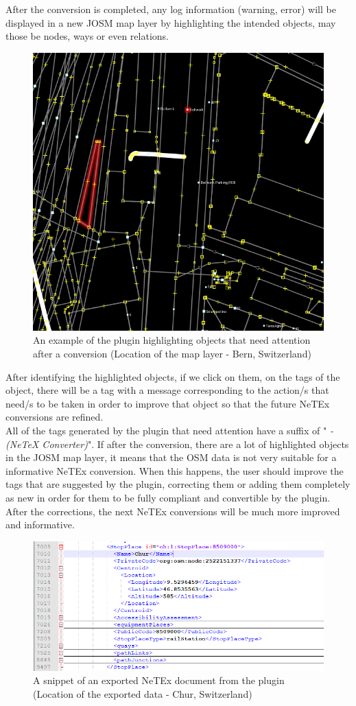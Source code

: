 After the conversion is completed, any log information (warning, error) will be displayed in a new JOSM map layer by highlighting the intended objects, may those be nodes, ways or even relations.
\begin{figure}[H]
	\includegraphics[width=\linewidth]{./Images/ArchitectureDesign/highlight_example.png}
	\caption{An example of the plugin highlighting objects that need attention after a conversion (Location of the map layer - Bern, Switzerland)}
\end{figure}
After identifying the highlighted objects, if we click on them, on the tags of the object, there will be a tag with a message corresponding to the action/s that need/s to be taken in order to improve that object so that the future NeTEx conversions are refined.\\
All of the tags generated by the plugin that need attention have a suffix of "\textit{ - (NeTeX Converter)}".
If after the conversion, there are a lot of highlighted objects in the JOSM map layer, it means that the OSM data is not very suitable for a informative NeTEx conversion. When this happens, the user should improve the tags that are suggested by the plugin, correcting them or adding them completely as new in order for them to be fully compliant and convertible by the plugin. After the corrections, the next NeTEx conversions will be much more improved and informative.
\begin{figure}[H]
	\includegraphics[width=\linewidth]{./Images/ArchitectureDesign/netex_doc_example.png}
	\caption{A snippet of an exported NeTEx document from the plugin (Location of the exported data - Chur, Switzerland)}
\end{figure}


